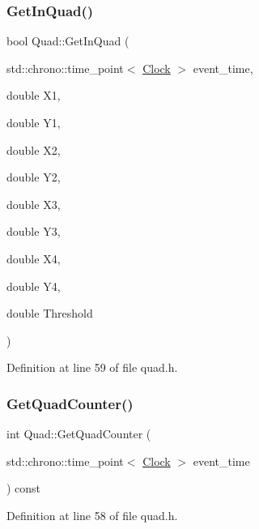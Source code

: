 \subsubsection{\texorpdfstring{Get\+In\+Quad()}{GetInQuad()}}
{\footnotesize\ttfamily bool Quad\+::\+Get\+In\+Quad (\begin{DoxyParamCaption}\item[{std\+::chrono\+::time\+\_\+point$<$ \mbox{\hyperlink{universe_8h_a0ef8d951d1ca5ab3cfaf7ab4c7a6fd80}{Clock}} $>$}]{event\+\_\+time,  }\item[{double}]{X1,  }\item[{double}]{Y1,  }\item[{double}]{X2,  }\item[{double}]{Y2,  }\item[{double}]{X3,  }\item[{double}]{Y3,  }\item[{double}]{X4,  }\item[{double}]{Y4,  }\item[{double}]{Threshold }\end{DoxyParamCaption})\hspace{0.3cm}{\ttfamily [inline]}}



Definition at line 59 of file quad.\+h.

\mbox{\label{class_quad_a56ac193fa18af6ec468463cc16588cc1}} 
\subsubsection{\texorpdfstring{Get\+Quad\+Counter()}{GetQuadCounter()}}
{\footnotesize\ttfamily int Quad\+::\+Get\+Quad\+Counter (\begin{DoxyParamCaption}\item[{std\+::chrono\+::time\+\_\+point$<$ \mbox{\hyperlink{universe_8h_a0ef8d951d1ca5ab3cfaf7ab4c7a6fd80}{Clock}} $>$}]{event\+\_\+time }\end{DoxyParamCaption}) const\hspace{0.3cm}{\ttfamily [inline]}}



Definition at line 58 of file quad.\+h.

\mbox{\label{class_quad_aba78e3b63f568529fcae1cfa6c3c54bf}} 
